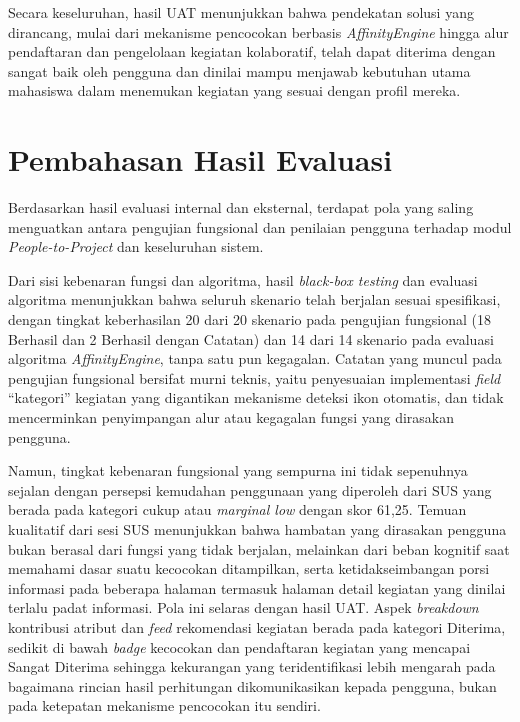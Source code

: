 Secara keseluruhan, hasil UAT menunjukkan bahwa pendekatan solusi yang dirancang, mulai dari mekanisme pencocokan berbasis \emph{AffinityEngine} hingga alur pendaftaran dan pengelolaan kegiatan kolaboratif, telah dapat diterima dengan sangat baik oleh pengguna dan dinilai mampu menjawab kebutuhan utama mahasiswa dalam menemukan kegiatan yang sesuai dengan profil mereka.

\section{Pembahasan Hasil Evaluasi}

Berdasarkan hasil evaluasi internal dan eksternal, terdapat pola yang saling menguatkan antara pengujian fungsional dan penilaian pengguna terhadap modul \emph{People-to-Project} dan keseluruhan sistem.

Dari sisi kebenaran fungsi dan algoritma, hasil \emph{black-box testing} dan evaluasi algoritma menunjukkan bahwa seluruh skenario telah berjalan sesuai spesifikasi, dengan tingkat keberhasilan 20 dari 20 skenario pada pengujian fungsional (18 Berhasil dan 2 Berhasil dengan Catatan) dan 14 dari 14 skenario pada evaluasi algoritma \emph{AffinityEngine}, tanpa satu pun kegagalan. Catatan yang muncul pada pengujian fungsional bersifat murni teknis, yaitu penyesuaian implementasi \emph{field} ``kategori'' kegiatan yang digantikan mekanisme deteksi ikon otomatis, dan tidak mencerminkan penyimpangan alur atau kegagalan fungsi yang dirasakan pengguna.

Namun, tingkat kebenaran fungsional yang sempurna ini tidak sepenuhnya sejalan dengan persepsi kemudahan penggunaan yang diperoleh dari SUS yang berada pada kategori cukup atau \emph{marginal low} dengan skor 61{,}25. Temuan kualitatif dari sesi SUS menunjukkan bahwa hambatan yang dirasakan pengguna bukan berasal dari fungsi yang tidak berjalan, melainkan dari beban kognitif saat memahami dasar suatu kecocokan ditampilkan, serta ketidakseimbangan porsi informasi pada beberapa halaman termasuk halaman detail kegiatan yang dinilai terlalu padat informasi. Pola ini selaras dengan hasil UAT. Aspek \emph{breakdown} kontribusi atribut dan \emph{feed} rekomendasi kegiatan berada pada kategori Diterima, sedikit di bawah \emph{badge} kecocokan dan pendaftaran kegiatan yang mencapai Sangat Diterima sehingga kekurangan yang teridentifikasi lebih mengarah pada bagaimana rincian hasil perhitungan dikomunikasikan kepada pengguna, bukan pada ketepatan mekanisme pencocokan itu sendiri.


